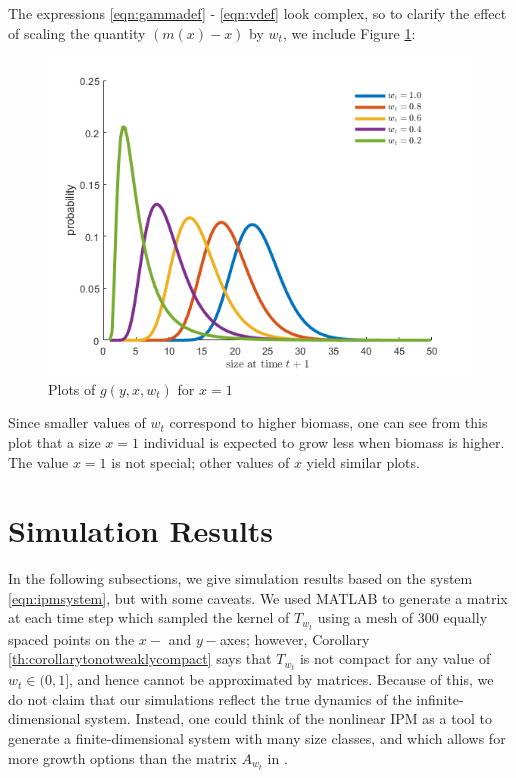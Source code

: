 The expressions \eqref{eqn:gammadef} - \eqref{eqn:vdef} look complex, so to clarify the effect of scaling the quantity $(m(x) - x)$ by $w_t$, we include Figure \ref{fig:nonlinear_comparison}:

\begin{figure}[H]
	\centering
	\includegraphics[width=0.7\linewidth]{Images/nonlinear_comparison}
	\caption{Plots of $g(y, x, w_t)$ for $x = 1$}
	\label{fig:nonlinear_comparison}
\end{figure}

Since smaller values of $w_t$ correspond to higher biomass, one can see from this plot that a size $x=1$ individual is expected to grow less when biomass is higher. The value $x=1$ is not special; other values of $x$ yield similar plots.

\begin{figure}
	
\end{figure}

\section{Simulation Results}

In the following subsections, we give simulation results based on the system \eqref{eqn:ipmsystem}, but with some caveats. We used MATLAB to generate a matrix at each time step which sampled the kernel of $T_{w_t}$ using a mesh of 300 equally spaced points on the $x-$ and $y-$axes; however, Corollary \ref{th:corollarytonotweaklycompact} says that $T_{w_t}$ is not compact for any value of $w_t \in (0,1]$, and hence cannot be approximated by matrices. Because of this, we do not claim that our simulations reflect the true dynamics of the infinite-dimensional system. Instead, one could think of the nonlinear IPM as a tool to generate a finite-dimensional system with many size classes, and which allows for more growth options than the matrix $A_{w_t}$ in \cite{Callahan2019}.

